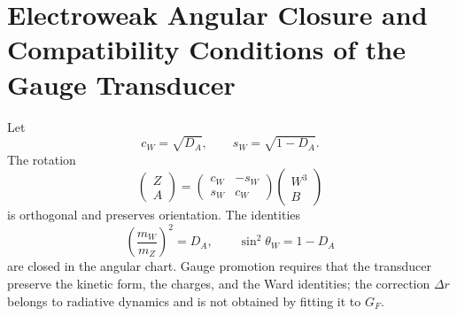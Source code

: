 \section{Electroweak Angular Closure and Compatibility Conditions of the Gauge Transducer}
\label{sec:p3-final:cierre-electrodebil}

Let
\[
 c_W=\sqrt{D_A},
 \qquad
 s_W=\sqrt{1-D_A}.
\]
The rotation
\[
 \begin{pmatrix}Z\\A\end{pmatrix}
 =
 \begin{pmatrix}c_W&-s_W\\s_W&c_W\end{pmatrix}
 \begin{pmatrix}W^3\\B\end{pmatrix}
\]
is orthogonal and preserves orientation. The identities
\[
 \left(\frac{m_W}{m_Z}\right)^2=D_A,
 \qquad
 \sin^2\theta_W=1-D_A
\]
are closed in the angular chart. Gauge promotion requires that the
transducer preserve the kinetic form, the charges, and the Ward identities;
the correction \(\Delta r\) belongs to radiative dynamics and is not obtained
by fitting it to \(G_F\).

